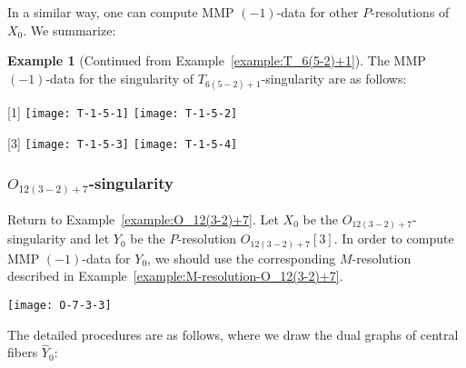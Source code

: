\documentclass[reqno, twoside, a4paper]{amsart}
\theoremstyle{definition}
\newtheorem{example}[theorem]{Example}
\numberwithin{equation}{section}
\begin{document}
In a similar way, one can compute MMP $(-1)$-data for other $P$-resolutions of $X_0$. We summarize:

\begin{example}[Continued from Example~\ref{example:T_6(5-2)+1}]
\label{example:MMP-(-1)-data-T_6(5-2)+1}
The MMP $(-1)$-data for the singularity of $T_{6(5-2)+1}$-singularity are as follows:

\begin{center}
[1] \texttt{[image: T-1-5-1]} \qquad \qquad
[2] \texttt{[image: T-1-5-2]}

[3] \texttt{[image: T-1-5-3]} \qquad \qquad
[4] \texttt{[image: T-1-5-4]}
\end{center}
\end{example}






\subsubsection{$O_{12(3-2)+7}$-singularity}

Return to Example~\ref{example:O_12(3-2)+7}. Let $X_0$ be the $O_{12(3-2)+7}$-singularity and let $Y_0$ be the $P$-resolution $O_{12(3-2)+7}[3]$. In order to compute MMP $(-1)$-data for $Y_0$, we should use the corresponding $M$-resolution described in Example~\ref{example:M-resolution-O_12(3-2)+7}.
%
\begin{center}
\texttt{[image: O-7-3-3]}
\end{center}

The detailed procedures are as follows, where we draw the dual graphs of central fibers $\widehat{Y}_0$:
\end{document}
